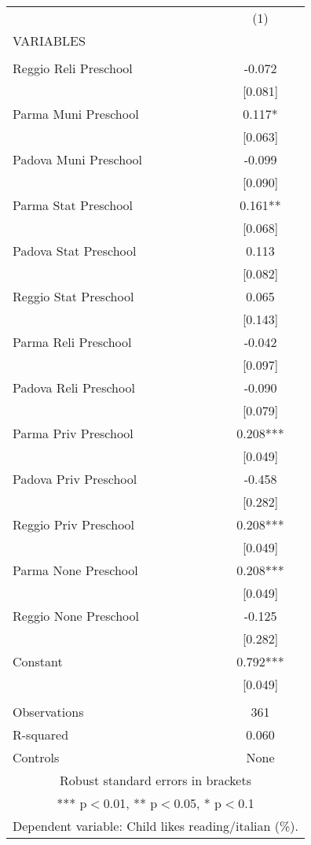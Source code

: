 \begin{tabular}{lc} \hline
 & (1) \\
VARIABLES &  \\ \hline
 &  \\
Reggio Reli Preschool & -0.072 \\
 & [0.081] \\
Parma Muni Preschool & 0.117* \\
 & [0.063] \\
Padova Muni Preschool & -0.099 \\
 & [0.090] \\
Parma Stat Preschool & 0.161** \\
 & [0.068] \\
Padova Stat Preschool & 0.113 \\
 & [0.082] \\
Reggio Stat Preschool & 0.065 \\
 & [0.143] \\
Parma Reli Preschool & -0.042 \\
 & [0.097] \\
Padova Reli Preschool & -0.090 \\
 & [0.079] \\
Parma Priv Preschool & 0.208*** \\
 & [0.049] \\
Padova Priv Preschool & -0.458 \\
 & [0.282] \\
Reggio Priv Preschool & 0.208*** \\
 & [0.049] \\
Parma None Preschool & 0.208*** \\
 & [0.049] \\
Reggio None Preschool & -0.125 \\
 & [0.282] \\
Constant & 0.792*** \\
 & [0.049] \\
 &  \\
Observations & 361 \\
R-squared & 0.060 \\
 Controls & None \\ \hline
\multicolumn{2}{c}{ Robust standard errors in brackets} \\
\multicolumn{2}{c}{ *** p$<$0.01, ** p$<$0.05, * p$<$0.1} \\
\multicolumn{2}{c}{ Dependent variable: Child likes reading/italian (\%).} \\
\end{tabular}
